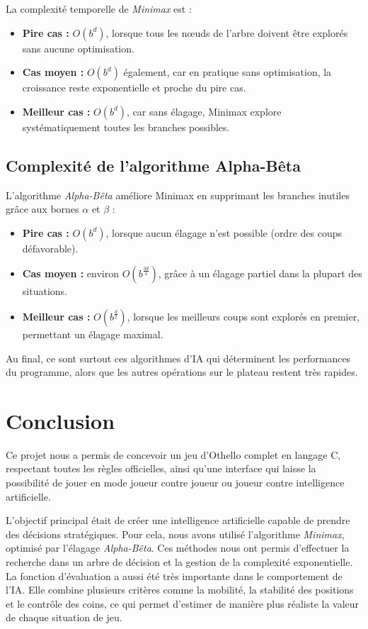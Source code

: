\documentclass{article}
\begin{document}
La complexité temporelle de \emph{Minimax} est :

\begin{itemize}
    \item \textbf{Pire cas :} $O(b^d)$, lorsque tous les nœuds de l'arbre doivent être explorés sans aucune optimisation.
    \item \textbf{Cas moyen :} $O(b^d)$ également, car en pratique sans optimisation, la croissance reste exponentielle et proche du pire cas.
    \item \textbf{Meilleur cas :} $O(b^d)$, car sans élagage, Minimax explore systématiquement toutes les branches possibles.
\end{itemize}

\subsection*{Complexité de l'algorithme Alpha-Bêta}

L'algorithme \emph{Alpha-Bêta} améliore Minimax en supprimant les branches inutiles grâce aux bornes $\alpha$ et $\beta$ :

\begin{itemize}
    \item \textbf{Pire cas :} $O(b^d)$, lorsque aucun élagage n'est possible (ordre des coups défavorable).
    \item \textbf{Cas moyen :} environ $O(b^{\frac{3d}{4}})$, grâce à un élagage partiel dans la plupart des situations.
    \item \textbf{Meilleur cas :} $O(b^{\frac{d}{2}})$, lorsque les meilleurs coups sont explorés en premier, permettant un élagage maximal.
\end{itemize}

Au final, ce sont surtout ces algorithmes d'IA qui déterminent les performances du programme, alors que les autres opérations sur le plateau restent très rapides.

\section{\textbf{Conclusion}}

Ce projet nous a permis de concevoir un jeu d'Othello complet en langage C, respectant toutes les règles officielles, ainsi qu'une interface qui laisse la possibilité de jouer en mode joueur contre joueur ou joueur contre intelligence artificielle.

L'objectif principal était de créer une intelligence artificielle capable de prendre des décisions stratégiques. Pour cela, nous avons utilisé l'algorithme \emph{Minimax}, optimisé par l'élagage \emph{Alpha-Bêta}. Ces méthodes nous ont permis d'effectuer la recherche dans un arbre de décision et la gestion de la complexité exponentielle. La fonction d'évaluation a aussi été très importante dans le comportement de l'IA. Elle combine plusieurs critères comme la mobilité, la stabilité des positions et le contrôle des coins, ce qui permet d'estimer de manière plus réaliste la valeur de chaque situation de jeu.
\end{document}
